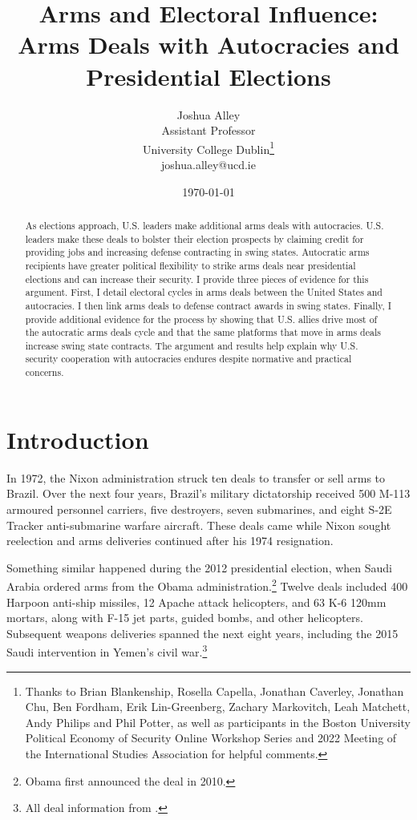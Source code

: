 \documentclass[12pt]{article}
\title{\textbf{Arms and Electoral Influence: Arms Deals with Autocracies and Presidential Elections}}
\author{Joshua Alley \\
Assistant Professor \\
University College Dublin\thanks{Thanks to Brian Blankenship, Rosella Capella, Jonathan Caverley, Jonathan Chu, Ben Fordham, Erik Lin-Greenberg, Zachary Markovitch, Leah Matchett, Andy Philips and Phil Potter, as well as participants in the Boston University Political Economy of Security Online Workshop Series and 2022 Meeting of the International Studies Association for helpful comments.} \\
joshua.alley@ucd.ie
}
\date{\today}
\begin{document}
\maketitle 

\begin{abstract} 
As elections approach, U.S. leaders make additional arms deals with autocracies. 
U.S. leaders make these deals to bolster their election prospects by claiming credit for providing jobs and increasing defense contracting in swing states.
Autocratic arms recipients have greater political flexibility to strike arms deals near presidential elections and can increase their security. 
I provide three pieces of evidence for this argument.  
First, I detail electoral cycles in arms deals between the United States and autocracies. 
I then link arms deals to defense contract awards in swing states.
Finally, I provide additional evidence for the process by showing that U.S. allies drive most of the autocratic arms deals cycle and that the same platforms that move in arms deals increase swing state contracts.  
The argument and results help explain why U.S. security cooperation with autocracies endures despite normative and practical concerns.
\end{abstract} 



\newpage 
\doublespace 


\section{Introduction}



In 1972, the Nixon administration struck ten deals to transfer or sell arms to Brazil.
Over the next four years, Brazil's military dictatorship received 500 M-113 armoured personnel carriers, five destroyers, seven submarines, and eight S-2E Tracker anti-submarine warfare aircraft.
These deals came while Nixon sought reelection and arms deliveries continued after his 1974 resignation. 


Something similar happened during the 2012 presidential election, when Saudi Arabia ordered arms from the Obama administration.\footnote{Obama first announced the deal in 2010.} 
Twelve deals included 400 Harpoon anti-ship missiles, 12 Apache attack helicopters, and 63 K-6 120mm mortars, along with F-15 jet parts, guided bombs, and other helicopters. 
Subsequent weapons deliveries spanned the next eight years, including the 2015 Saudi intervention in Yemen's civil war.\footnote{All deal information from \citep{SIPRI2021}.}
\end{document}
